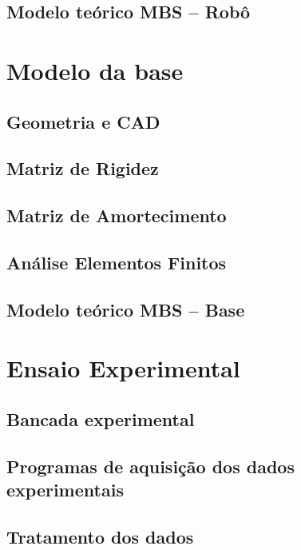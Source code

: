 \subsection{Modelo teórico MBS -- Robô}


\section{Modelo da base}

\subsection{Geometria e CAD}

\subsection{Matriz de Rigidez}

\subsection{Matriz de Amortecimento}

\subsection{Análise Elementos Finitos}

\subsection{Modelo teórico MBS -- Base}


\section{Ensaio Experimental}

\subsection{Bancada experimental}

\subsection{Programas de aquisição dos dados experimentais}

\subsection{Tratamento dos dados}

